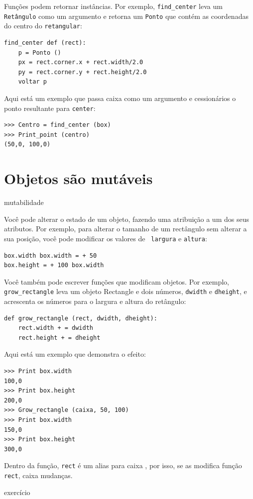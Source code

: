 \documentclass[10pt]{book}
\begin{document}
\begin{v erbatim}
{Funções podem retornar instâncias. Por exemplo, \verb "find_center"
leva um {\tt Retângulo} como um argumento e retorna um {\tt Ponto}
que contém as coordenadas do centro do {\tt retangular}:

\begin{verbatim}
find_center def (rect):
    p = Ponto ()
    px = rect.corner.x + rect.width/2.0
    py = rect.corner.y + rect.height/2.0
    voltar p
\end{verbatim}
%
Aqui está um exemplo que passa {caixa \tt} como um argumento e cessionários
o ponto resultante para {\tt center}:

\begin{verbatim}
>>> Centro = find_center (box)
>>> Print_point (centro)
(50,0, 100,0)
\end{verbatim}
%

\section{Objetos são mutáveis}
\index{} mutabilidade

Você pode alterar o estado de um objeto, fazendo uma atribuição a um dos
seus atributos. Por exemplo, para alterar o tamanho de um rectângulo
sem alterar a sua posição, você pode modificar os valores de {\tt
largura} e {\tt altura}:

\begin{verbatim}
box.width box.width = + 50
box.height = + 100 box.width
\end{verbatim}
%
Você também pode escrever funções que modificam objetos. Por exemplo,
\Verb "grow_rectangle" leva um objeto Rectangle e dois números,
{\tt dwidth} e {\tt dheight}, e acrescenta os números para o
largura e altura do retângulo:

\begin{verbatim}
def grow_rectangle (rect, dwidth, dheight):
    rect.width + = dwidth
    rect.height + = dheight
\end{verbatim}
%
Aqui está um exemplo que demonstra o efeito:

\begin{verbatim}
>>> Print box.width
100,0
>>> Print box.height
200,0
>>> Grow_rectangle (caixa, 50, 100)
>>> Print box.width
150,0
>>> Print box.height
300,0
\end{verbatim}
%
Dentro da função, {\tt rect} é um
alias para {caixa \tt}, por isso, se as modifica função {\tt rect}, 
{caixa \tt} mudanças.

\begin{} exercício


\end{}}
\end{v erbatim}
\end{document}

